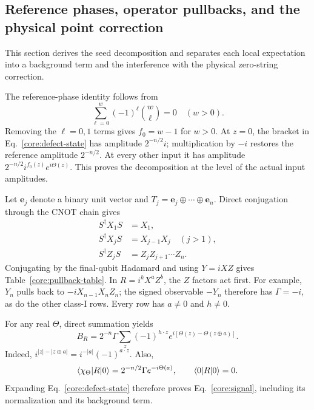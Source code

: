 \subsection{Reference phases, operator pullbacks, and the physical point correction}
\label{core:pullbacks}

This section derives the seed decomposition and separates each local expectation into a background term and the interference with the physical zero-string correction.

The reference-phase identity follows from
\begin{equation}
 \sum_{\ell=0}^{w}(-1)^\ell\binom w\ell=0\quad(w>0).
\end{equation}
Removing the $\ell=0,1$ terms gives $f_0=w-1$ for $w>0$. At $z=0$, the bracket in Eq.~\eqref{core:defect-state} has amplitude $2^{-n/2}i$; multiplication by $-i$ restores the reference amplitude $2^{-n/2}$. At every other input it has amplitude $2^{-n/2}i^{f_0(z)}e^{i\Theta(z)}$. This proves the decomposition at the level of the actual input amplitudes.

Let $\mathbf e_j$ denote a binary unit vector and $T_j=\mathbf e_j\oplus\cdots\oplus\mathbf e_n$. Direct conjugation through the CNOT chain gives
\begin{align}
 S^\dagger X_1S&=X_1,\nonumber\\
 S^\dagger X_jS&=X_{j-1}X_j\quad(j>1),\nonumber\\
 S^\dagger Z_jS&=Z_jZ_{j+1}\cdots Z_n.
 \label{core:cnot-pullbacks}
\end{align}
Conjugating by the final-qubit Hadamard and using $Y=iXZ$ gives Table~\ref{core:pullback-table}. In $R=i^kX^aZ^b$, the $Z$ factors act first. For example, $Y_n$ pulls back to $-iX_{n-1}X_nZ_n$; the signed observable $-Y_n$ therefore has $\Gamma=-i$, as do the other class-I rows. Every row has $a\ne0$ and $h\ne0$.

For any real $\Theta$, direct summation yields
\begin{equation}
 B_R=2^{-n}\Gamma\sum_z(-1)^{h\cdot z}
 e^{i[\Theta(z)-\Theta(z\oplus a)]}.
 \label{core:background-sum}
\end{equation}
Indeed, $i^{|z|-|z\oplus a|}=i^{-|a|}(-1)^{a\cdot z}$. Also,
\begin{equation}
 \langle \chi_\Theta\rvert R\lvert 0\rangle
 =2^{-n/2}\Gamma e^{-i\Theta(a)},\qquad
 \langle 0\rvert R\lvert 0\rangle=0.
\end{equation}
Expanding Eq.~\eqref{core:defect-state} therefore proves Eq.~\eqref{core:signal}, including its normalization and its background term.

